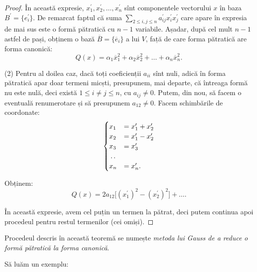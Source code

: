 \begin{proof}
În această expresie, $x^{\prime}_1, x^{\prime}_2, \dots, x^{\prime}_n$ sînt
componentele vectorului $x$ în baza $B^{\prime} = \{e^{\prime}_i\}$. De remarcat
faptul că suma $\displaystyle\sum_{2 \leq i,j \leq n} a^{\prime}_{ij} 
x^{\prime}_i x^{\prime}_j$ care apare în expresia de mai sus este o formă 
pătratică cu $n - 1$ variabile. Așadar, după cel mult $n - 1$ astfel de pași,
obținem o bază $\overline{B} = \{\overline{e}_i \}$ a lui $V$, față de care
forma pătratică are forma canonică: 
 \[
	Q(x) = \alpha_1 \overline{x}_1^2 + \alpha_2 \overline{x}_2^2 + \dots
	            + \alpha_n \overline{x}_n^2.
\]

(2) Pentru al doilea caz, dacă toți coeficienții $a_{ii}$ sînt nuli, adică în 
forma pătratică apar doar termeni micști, presupunem, mai departe, că întreaga
formă nu este nulă, deci există $1 \leq i \neq j \leq n$, cu $a_{ij} \neq 0$.
Putem, din nou, să facem o eventuală renumerotare și să presupunem $a_{12} 
\neq 0$. Facem schimbările de coordonate: 
 \[
	\begin{cases}	
	    x_1 &= x^{\prime}_1 + x^{\prime}_2 \\
	    x_2 &= x^{\prime}_1 - x^{\prime}_2 \\
	    x_3 &= x^{\prime}_3 \\
	    \dotfill \\
	    x_n &= x^{\prime}_n. 
    \end{cases}
\]

Obținem: 
 \[
	Q(x) = 2a_{12} \Big[ (x^{\prime}_1)^2 - (x^{\prime}_2)^2 \Big] + \dots.
\]

În această expresie, avem cel puțin un termen la pătrat, deci putem continua
apoi procedeul pentru restul termenilor (cei omiși).
\end{proof}

Procedeul descris în această teoremă se numește \emph{metoda lui Gauss de a
reduce o formă pătratică la forma canonică}.

Să luăm un exemplu:

